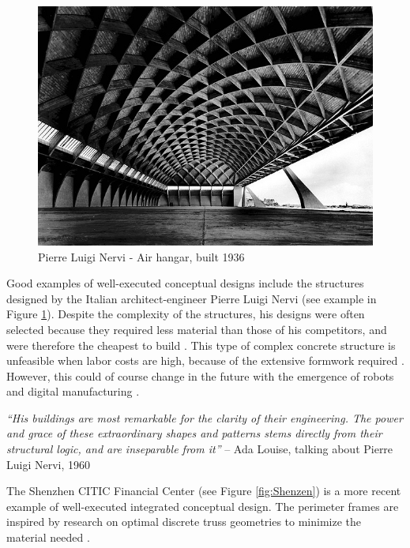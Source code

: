 \begin{figure}
  \includegraphics[width=350pt]{graphics/nervi.jpg}
  \caption{Pierre Luigi Nervi - Air hangar, built 1936}
  \label{fig:nervi}
\end{figure}

Good examples of well-executed conceptual designs include the structures designed by the Italian architect-engineer Pierre Luigi Nervi (see example in Figure \ref{fig:nervi}). Despite the complexity of the structures, his designs were often selected because they required less material than those of his competitors, and were therefore the cheapest to build \cite{Addis2007}. This type of complex concrete structure is unfeasible when labor costs are high, because of the extensive formwork required \cite{Todisco2015}. However, this could of course change in the future with the emergence of robots and digital manufacturing \cite{MadeByRobots}.

\textit{``His buildings are most remarkable for the clarity of their engineering. The power and grace of these extraordinary shapes and patterns stems directly from their structural logic, and are inseparable from it''} – Ada Louise, talking about Pierre Luigi Nervi, 1960 \cite{Mueller2014}

The Shenzhen CITIC Financial Center (see Figure \ref{fig:Shenzen}) is a more recent example of well-executed integrated conceptual design. The perimeter frames are inspired by research on optimal discrete truss geometries to minimize the material needed \cite{Stromberg2012a}.

